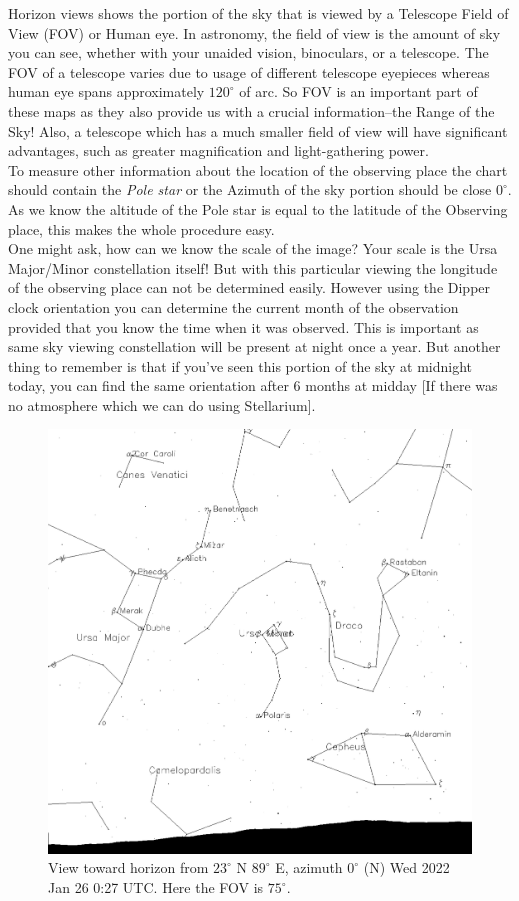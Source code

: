 \documentclass[a4paper,12pt]{extarticle}
\begin{document}
Horizon views shows the portion of the sky that is viewed by a Telescope Field of View (FOV) or Human eye. In astronomy, the field of view is the amount of sky you can see, whether with your unaided vision, binoculars, or a telescope. The FOV of a telescope varies due to usage of different telescope eyepieces whereas human eye spans approximately $120^\circ$ of arc. So FOV is an important part of these maps as they also provide us with a crucial information--the Range of the Sky! Also, a telescope which has a much smaller field of view will have significant advantages, such as greater magnification and light-gathering power. \\

To measure other information about the location of the observing place the chart should contain the \textit{Pole star} or the Azimuth of the sky portion should be close $0^\circ$. As we know the altitude of the Pole star is equal to the latitude of the Observing place, this makes the whole procedure easy. \\

One might ask, how can we know the scale of the image? Your scale is the Ursa Major/Minor constellation itself! But with this particular viewing the longitude of the observing place can not be determined easily. However using the Dipper clock orientation you can determine the current month of the observation provided that you know the time when it was observed. This is important as same sky viewing constellation will be present at night once a year. But another thing to remember is that if you've seen this portion of the sky at midnight today, you can find the same orientation after 6 months at midday [If there was no atmosphere which we can do using Stellarium].
\begin{figure}[H]
    \centering
    \includegraphics[width=0.6\linewidth]{Hor_1.png}
    \caption{View toward horizon from $23^\circ$ N $89^\circ$ E, azimuth $0^\circ$ (N) Wed 2022 Jan 26 0:27 UTC. Here the FOV is $75^\circ$.}
\end{figure}
\end{document}
